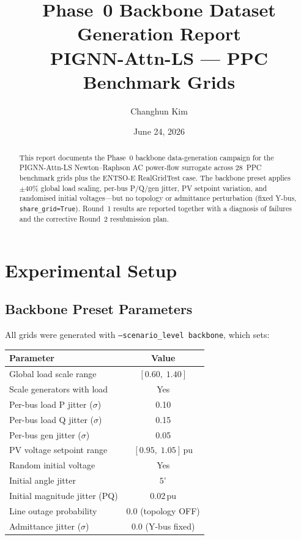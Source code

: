 \documentclass{article}
\title{Phase~0 Backbone Dataset Generation Report\\
\large PIGNN-Attn-LS --- PPC Benchmark Grids}
\author{Changhun Kim}
\date{June 24, 2026}
\begin{document}
\maketitle

\begin{abstract}
This report documents the Phase~0 backbone data-generation campaign for the
PIGNN-Attn-LS Newton--Raphson AC power-flow surrogate across 28~PPC benchmark
grids plus the ENTSO-E RealGridTest case.
The backbone preset applies $\pm40\%$ global load scaling, per-bus P/Q/gen
jitter, PV setpoint variation, and randomised initial voltages---but no
topology or admittance perturbation (fixed Y-bus, \texttt{share\_grid=True}).
Round~1 results are reported together with a diagnosis of failures and the
corrective Round~2 resubmission plan.
\end{abstract}


\section{Experimental Setup}

\subsection{Backbone Preset Parameters}

All grids were generated with \texttt{--scenario\_level backbone}, which sets:

\begin{center}
\begin{tabular}{lc}
\toprule
\textbf{Parameter} & \textbf{Value} \\
\midrule
Global load scale range & $[0.60,\; 1.40]$ \\
Scale generators with load & Yes \\
Per-bus load P jitter ($\sigma$) & 0.10 \\
Per-bus load Q jitter ($\sigma$) & 0.15 \\
Per-bus gen jitter ($\sigma$) & 0.05 \\
PV voltage setpoint range & $[0.95,\; 1.05]$\,pu \\
Random initial voltage & Yes \\
Initial angle jitter & $5^{\circ}$ \\
Initial magnitude jitter (PQ) & 0.02\,pu \\
Line outage probability & 0.0 (topology OFF) \\
Admittance jitter ($\sigma$) & 0.0 (Y-bus fixed) \\
\bottomrule
\end{tabular}
\end{center}
\end{document}

